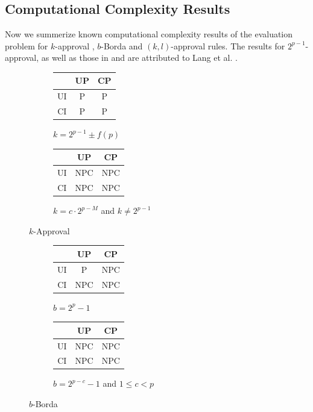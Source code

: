 \subsection{Computational Complexity Results}
Now we summerize known computational complexity results of the evaluation problem
for $k$-approval , $b$-Borda  and 
$(k,l)$-approval  rules.
The results for $2^{p-1}$-approval, as well as those in 
and  are attributed to Lang et al. \cite{lang:aggLP}.
\begin{figure}
	\centering
  \begin{subfigure}[b]{0.5\textwidth}
		\centering
		\begin{tabular}[0.5\textwidth]{ | c | c | c | }
		  \hline
		    & UP & CP \\
		  \hline
		  UI & P & P \\
		  \hline
		  CI & P & P \\
		  \hline
		\end{tabular}
		\caption{$k=2^{p-1}\pm f(p)$}
		\label{fig:kApp_comp_a}
	\end{subfigure}%
  \begin{subfigure}[b]{0.5\textwidth}
		\centering
		\begin{tabular}[0.5\textwidth]{ | c | c | c | }
		  \hline
		    & UP & CP \\
		  \hline
		  UI & NPC & NPC \\
		  \hline
		  CI & NPC & NPC \\
		  \hline
		\end{tabular}
		\caption{$k=c\cdot 2^{p-M}$ and $k \not = 2^{p-1}$}
		\label{fig:kApp_comp_b}
	\end{subfigure}
	\caption{$k$-Approval}
	\label{fig:kApp_comp}
\end{figure}

\begin{figure}
	\centering
  \begin{subfigure}[b]{0.5\textwidth}
		\centering
		\begin{tabular}[0.5\textwidth]{ | c | c | c | }
		  \hline
		    & UP & CP \\
		  \hline
		  UI & P & NPC \\
		  \hline
		  CI & NPC & NPC \\
		  \hline
		\end{tabular}
		\caption{$b=2^p-1$}
		\label{fig:bBorda_comp_a}
	\end{subfigure}%
  \begin{subfigure}[b]{0.5\textwidth}
		\centering
		\begin{tabular}[0.5\textwidth]{ | c | c | c | }
		  \hline
		    & UP & CP \\
		  \hline
		  UI & NPC & NPC \\
		  \hline
		  CI & NPC & NPC \\
		  \hline
		\end{tabular}
		\caption{$b=2^{p-c}-1$ and $1 \leq c < p$}
		\label{fig:bBorda_comp_b}
	\end{subfigure}
	\caption{$b$-Borda}
	\label{fig:bBorda_comp}
\end{figure}

